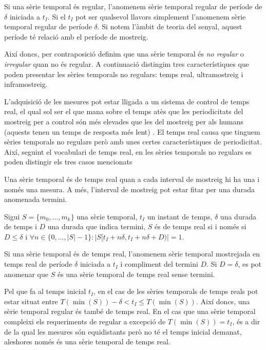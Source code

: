 Si una sèrie temporal és regular, l'anomenem sèrie temporal regular de
període de $\delta$ iniciada a $t_I$. Si el $t_I$ pot ser qualsevol
llavors simplement l'anomenem sèrie temporal regular de període
$\delta$.  Si notem l'àmbit de teoria del senyal, aquest període té
relació amb el període de mostreig.


Així doncs, per contraposició definim que una sèrie temporal és
\emph{no regular} o \emph{irregular} quan no és regular.  A
continuació distingim tres característiques que poden presentar les
sèries temporals no regulars: temps real, ultramostreig i inframostreig.

\todo{} L'adquisició de les mesures pot estar lligada a un sistema de
control de temps real, el qual sol ser el que mana sobre el temps atès
que les periodicitats del mostreig per a control són més elevades que
les del mostreig per als humans (aquests tenen un temps de resposta
més lent) \parencite[cap.~1]{kopetz11:realtime}.  El temps real causa
que tinguem sèries temporals no regulars però amb unes certes
característiques de periodicitat.  Així, seguint el vocabulari de
temps real, en les sèries temporals no regulars es poden distingir els
tres casos mencionats


Una sèrie temporal és de temps real quan a cada interval de mostreig
hi ha una i només una mesura. A més, l'interval de mostreig pot estar
fitar per una durada anomenada termini.
\begin{definition}
  \label{def:st:tempsreal}
  Sigui $S=\{m_0,\dotsc,m_k\}$ una sèrie temporal, $t_I$ un instant de
  temps, $\delta$ una durada de temps i $D$ una durada que indica
  termini, $S$ és de temps real si i només si $D\leq\delta$
  i $\forall n\in\{0,\ldots,|S|-1\}: |S[t_I+n\delta,t_I+n\delta+D)| = 1$. 
\end{definition}

Si una sèrie temporal és de temps real, l'anomenem sèrie temporal
mostrejada en temps real de període $\delta$ iniciada a $t_I$ i
compliment del termini $D$.  Si $D=\delta$, es pot anomenar que $S$ és
una sèrie temporal de temps real sense termini.

Pel que fa al temps inicial $t_I$, en el cas de les sèries temporals
de temps reals pot estar situat entre $T(\min(S))-\delta < t_I \leq
T(\min(S))$.  Així doncs, una sèrie temporal regular és també de temps
real. En el cas que una sèrie temporal compleixi els requeriments de
regular a excepció de $T(\min(S))=t_I$, és a dir de la qual les
mesures són equidistants però no té el temps inicial demanat,
aleshores només és una sèrie temporal de temps real.



